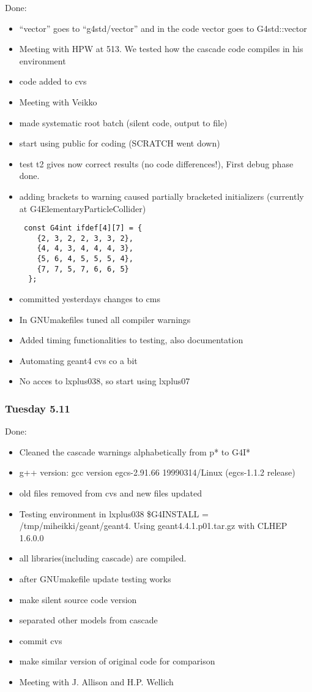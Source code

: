 Done:
\begin{itemize}
\item ``vector'' goes to ``g4std/vector'' and in the code vector goes
  to G4std::vector
\item Meeting with HPW at 513. We tested how the cascade code compiles
  in his environment
\item code added to cvs
\item Meeting with Veikko
\item made systematic root batch (silent code, output to file)
\item start using public for coding (SCRATCH went down)
\item test t2 gives now correct results (no code differences!), First
  debug phase done.
\item adding brackets to warning caused partially bracketed
  initializers (currently at G4ElementaryParticleCollider)

\begin{verbatim}
 const G4int ifdef[4][7] = {
    {2, 3, 2, 2, 3, 3, 2}, 
    {4, 4, 3, 4, 4, 4, 3}, 
    {5, 6, 4, 5, 5, 5, 4},
    {7, 7, 5, 7, 6, 6, 5}
  };
\end{verbatim}
  
\item committed yesterdays changes to cms
\item In GNUmakefiles tuned all compiler warnings
\item Added timing functionalities to testing, also documentation
\item Automating geant4 cvs co a bit
\item No acces to lxplus038, so start using lxplus07

\end{itemize}

\subsubsection{Tuesday 5.11}

Done:
\begin{itemize}
\item Cleaned the cascade warnings alphabetically from p* to G4I*
\item g++ version: gcc version egcs-2.91.66 19990314/Linux (egcs-1.1.2
  release)
\item old files removed from cvs and new files updated
\item Testing environment in lxplus038 \$G4INSTALL =
  /tmp/miheikki/geant/geant4. Using geant4.4.1.p01.tar.gz with CLHEP
  1.6.0.0
\item all libraries(including cascade) are compiled.
\item after GNUmakefile update testing works
\item make silent source code version
\item separated other models from cascade
\item commit cvs
\item make similar version of original code for comparison
\item Meeting with J. Allison and H.P. Wellich

\end{itemize}

